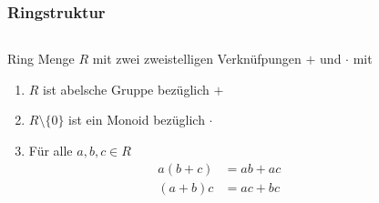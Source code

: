 %
%
%
\begin{frame}[t]
\frametitle{Ringstruktur}
\setlength{\abovedisplayskip}{5pt}
\setlength{\belowdisplayskip}{5pt}
\begin{columns}[t,onlytextwidth]
\begin{column}{0.46\textwidth}
\begin{block}{Ring}
Menge $R$ mit zwei zweistelligen Verknüfpungen $+$ und $\cdot$
mit
\begin{enumerate}
\item<3->
$R$ ist abelsche Gruppe bezüglich $+$
\item<5->
$R\setminus\{0\}$ ist ein Monoid bezüglich $\cdot$
\item<7->
Für alle $a,b,c\in R$
\begin{align*}
a(b+c) &= ab+ac
\\
(a+b)c &= ac+bc
\end{align*}
\end{enumerate}
\end{block}
\end{column}
\begin{column}{0.50\textwidth}
\end{column}
\end{columns}
\end{frame}
